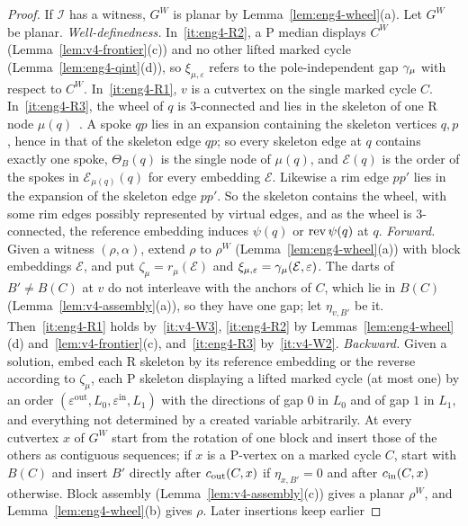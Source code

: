 \begin{proof}
If $\mathcal I$ has a witness, $G^W$ is planar by
Lemma~\ref{lem:eng4-wheel}(a). Let $G^W$ be planar.
\emph{Well-definedness.} In~\ref{it:eng4-R2}, a P median displays $C^W$
(Lemma~\ref{lem:v4-frontier}(c)) and no other lifted marked cycle
(Lemma~\ref{lem:eng4-qint}(d)), so $\xi_{\mu,\varepsilon}$ refers to the
pole-independent gap $\gamma_\mu$ with respect to $C^W$. In~\ref{it:eng4-R1},
$v$ is a cutvertex on the single marked cycle $C$. In~\ref{it:eng4-R3}, the
wheel of $q$ is $3$-connected and lies in the skeleton of one R node
$\mu(q)$~\cite[proof of Lemma~8]{BFR21}. A spoke $qp$ lies in an expansion
containing the skeleton vertices $q,p$, hence in that of the skeleton edge
$qp$; so every skeleton edge at $q$ contains exactly one spoke,
$\Theta_B(q)$ is the single node of $\mu(q)$, and $\mathcal E(q)$ is the
order of the spokes in $\mathcal E_{\mu(q)}(q)$ for every embedding
$\mathcal E$. Likewise a rim edge $pp'$ lies in the expansion of the
skeleton edge $pp'$. So the skeleton contains the wheel, with some rim
edges possibly represented by virtual edges, and as the wheel is
$3$-connected, the reference embedding induces $\psi(q)$ or $\operatorname{rev}\psi(q)$ at $q$.
\emph{Forward.} Given a witness $(\rho,\alpha)$, extend $\rho$ to $\rho^W$
(Lemma~\ref{lem:eng4-wheel}(a)) with block embeddings $\mathcal E$, and put
$\zeta_\mu=r_\mu(\mathcal E)$ and $\xi_{\mu,\varepsilon}=\gamma_\mu(\mathcal
E,\varepsilon)$. The darts of $B'\ne B(C)$ at $v$ do not interleave with the
anchors of $C$, which lie in $B(C)$ (Lemma~\ref{lem:v4-assembly}(a)), so they
have one gap; let $\eta_{v,B'}$ be it. Then~\ref{it:eng4-R1} holds
by~\ref{it:v4-W3}, \ref{it:eng4-R2} by Lemmas~\ref{lem:eng4-wheel}(d)
and~\ref{lem:v4-frontier}(c), and~\ref{it:eng4-R3} by~\ref{it:v4-W2}.
\emph{Backward.} Given a solution, embed each R skeleton by its reference
embedding or the reverse according to $\zeta_\mu$, each P skeleton
displaying a lifted marked cycle (at most one) by an order
$(\varepsilon^{\mathrm{out}},L_0,\varepsilon^{\mathrm{in}},L_1)$ with the
directions of gap $0$ in $L_0$ and of gap $1$ in $L_1$, and everything not
determined by a created variable arbitrarily. At every cutvertex $x$ of
$G^W$ start from the rotation of one block and insert those of the others as
contiguous sequences; if $x$ is a P-vertex on a marked cycle $C$, start with
$B(C)$ and insert $B'$ directly after $c_{\mathrm{out}}(C,x)$ if $\eta_{x,B'}=0$ and
after $c_{\mathrm{in}}(C,x)$ otherwise. Block assembly
(Lemma~\ref{lem:v4-assembly}(c)) gives a planar $\rho^W$, and
Lemma~\ref{lem:eng4-wheel}(b) gives $\rho$. Later insertions keep earlier

\end{proof}
